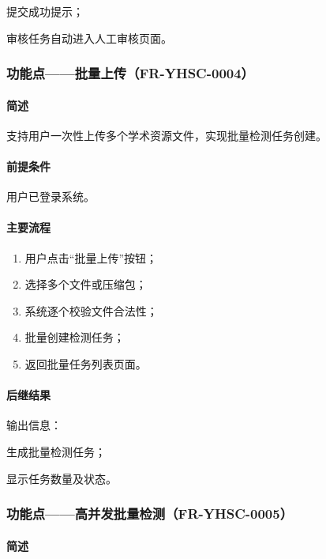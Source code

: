 提交成功提示；

审核任务自动进入人工审核页面。

{\color{black}
\subsubsection{功能点——批量上传（FR-YHSC-0004）}

\paragraph*{简述}

支持用户一次性上传多个学术资源文件，实现批量检测任务创建。

\paragraph*{前提条件}

用户已登录系统。

\paragraph*{主要流程}

\begin{enumerate}
    \item 用户点击“批量上传”按钮；
    \item 选择多个文件或压缩包；
    \item 系统逐个校验文件合法性；
    \item 批量创建检测任务；
    \item 返回批量任务列表页面。
\end{enumerate}

\paragraph*{后继结果}

输出信息：

生成批量检测任务；

显示任务数量及状态。
}

\subsubsection{功能点——高并发批量检测（FR-YHSC-0005）}

\paragraph*{简述}

